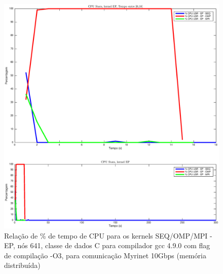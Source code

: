 \documentclass[conference,compsoc]{IEEEtran}
\begin{document}
\begin{figure}[H]
\centering
\includegraphics[width=1.1\columnwidth]{EPS/dstat_EP_seq_vs_omp_vs_mpi/cpu.eps}
\caption{Relação de \% de tempo de CPU para os kernels SEQ/OMP/MPI - EP, nós 641, classe de dados C para compilador gcc 4.9.0 com flag de compilação  -O3, para comunicação Myrinet 10Gbps (memória distribuída)}
\label{dstat_ep_SOM_cpu}
\end{figure}
\end{document}
